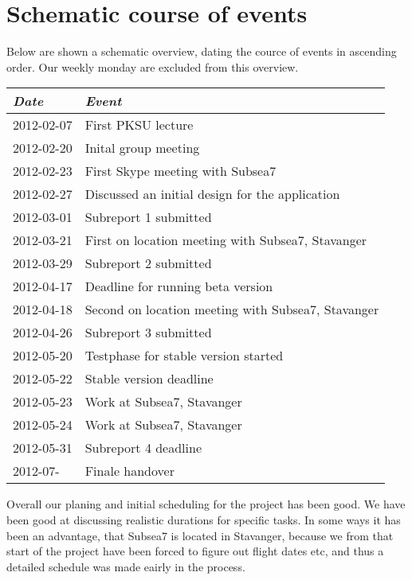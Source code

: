 \section{Schematic course of events }
Below are shown a schematic overview, dating the cource of events in ascending order. Our weekly monday
are excluded from this overview.
\begin{center}
    \begin{tabular}{ll}
    \emph{Date} & \emph{Event} \\ \hline
    2012-02-07  & First PKSU lecture \\ 
    2012-02-20  & Inital group meeting \\ 
    2012-02-23  & First Skype meeting with Subsea7\\
    2012-02-27  & Discussed an initial design for the application\\
    2012-03-01  & Subreport 1 submitted \\
    2012-03-21  & First on location meeting with Subsea7, Stavanger \\
    2012-03-29  & Subreport 2 submitted \\
    2012-04-17  & Deadline for running beta version \\
    2012-04-18  & Second on location meeting with Subsea7, Stavanger \\
    2012-04-26  & Subreport 3 submitted \\
    2012-05-20  & Testphase for stable version started \\
    2012-05-22  & Stable version deadline \\
    2012-05-23  & Work at Subsea7, Stavanger \\
    2012-05-24  & Work at Subsea7, Stavanger \\
    2012-05-31  & Subreport 4 deadline \\
    2012-07-    & Finale handover \\
    \end{tabular}
\end{center}
Overall our planing and initial scheduling for the project has been good. 
We have been good at discussing realistic durations for specific tasks. 
In some ways it has been an advantage, that Subsea7 is located in Stavanger, 
because we from that start of the project have been forced to figure out flight dates 
etc, and thus a detailed schedule was made eairly in the process.
